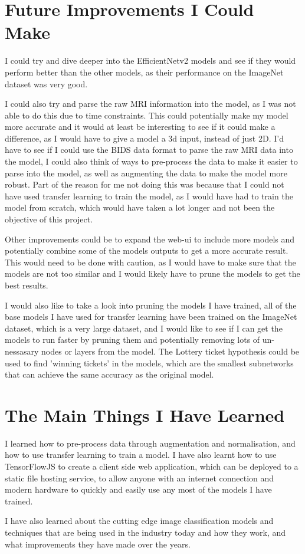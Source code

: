 \documentclass[]{final_report}
\begin{document}
\section{Future Improvements I Could Make}

I could try and dive deeper into the EfficientNetv2 models and see if they would perform better than the other models, as their performance on the ImageNet\cite{ImageNet} dataset was very good. 

I could also try and parse the raw MRI information into the model, as I was not able to do this due to time constraints. This could potentially make my model more accurate and it would at least be interesting to see if it could make a difference, as I would have to give a model a 3d input, instead of just 2D. I'd have to see if I could use the BIDS data format to parse the raw MRI data into the model, I could also think of ways to pre-process the data to make it easier to parse into the model, as well as augmenting the data to make the model more robust. Part of the reason for me not doing this was because that I could not have used transfer learning to train the model, as I would have had to train the model from scratch, which would have taken a lot longer and not been the objective of this project.

Other improvements could be to expand the web-ui to include more models and potentially combine some of the models outputs to get a more accurate result. This would need to be done with caution, as I would have to make sure that the models are not too similar and I would likely have to prune the models to get the best results.

I would also like to take a look into pruning the models I have trained, all of the base models I have used for transfer learning have been trained on the ImageNet dataset, which is a very large dataset, and I would like to see if I can get the models to run faster by pruning them and potentially removing lots of un-nessasary nodes or layers from the model. The Lottery ticket hypothesis\cite{LotteryTicket} could be used to find 'winning tickets' in the models, which are the smallest subnetworks that can achieve the same accuracy as the original model.

\section{The Main Things I Have Learned}

I learned how to pre-process data through augmentation and normalisation, and how to use transfer learning to train a model. I have also learnt how to use TensorFlowJS to create a client side web application, which can be deployed to a static file hosting service, to allow anyone with an internet connection and modern hardware to quickly and easily use any most of the models I have trained.

I have also learned about the cutting edge image classification models and techniques that are being used in the industry today and how they work, and what improvements they have made over the years.

\newpage
\printbibliography
\label{endpage}
\end{document}
